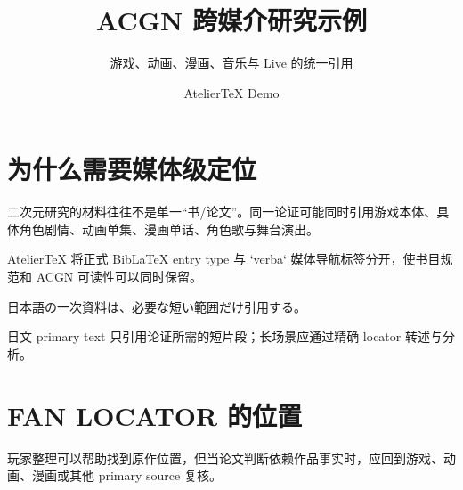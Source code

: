 \documentclass[profile=editorial]{atelier}
\title{ACGN 跨媒介研究示例}
\subtitle{游戏、动画、漫画、音乐与 Live 的统一引用}
\author{AtelierTeX Demo}
\begin{document}
\maketitle

\section{为什么需要媒体级定位}

二次元研究的材料往往不是单一“书/论文”。同一论证可能同时引用游戏本体\cite{demo_game}、具体角色剧情\cite{demo_commu}、动画单集\cite[00:12:31--00:12:46]{demo_anime}、漫画单话\cite[45--52]{demo_manga}、角色歌\cite{demo_song}与舞台演出\cite{demo_live}。

AtelierTeX 将正式 BibLaTeX entry type 与 `verba` 媒体导航标签分开，使书目规范和 ACGN 可读性可以同时保留。

\begin{AtelierOriginal}
日本語の一次資料は、必要な短い範囲だけ引用する。
\end{AtelierOriginal}

\begin{AtelierTranslation}
日文 primary text 只引用论证所需的短片段；长场景应通过精确 locator 转述与分析。
\end{AtelierTranslation}

\section{FAN LOCATOR 的位置}

玩家整理可以帮助找到原作位置\cite{demo_locator}，但当论文判断依赖作品事实时，应回到游戏、动画、漫画或其他 primary source 复核。

\printbibliography
\end{document}
